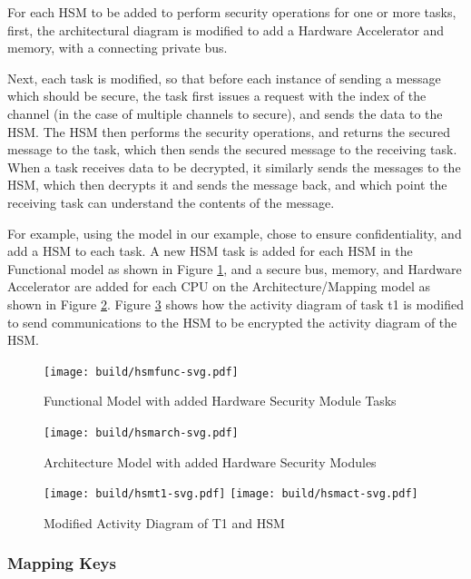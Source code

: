 \documentclass[12pt]{article}
\begin{document}
For each HSM to be added to perform security operations for one or more tasks, first, the architectural diagram is modified to add a Hardware Accelerator and memory, with a connecting private bus.

Next, each task is modified, so that before each instance of sending a message which should be secure, the task first issues a request with the index of the channel (in the case of multiple channels to secure), and sends the data to the HSM. The HSM then performs the security operations, and returns the secured message to the task, which then sends the secured message to the receiving task. When a task receives data to be decrypted, it similarly sends the messages to the HSM, which then decrypts it and sends the message back, and which point the receiving task can understand the contents of the message.

For example, using the model in our example, chose to ensure confidentiality, and add a HSM to each task. A new HSM task is added for each HSM in the Functional model as shown in Figure \ref{fig:hsmfunc}, and a secure bus, memory, and Hardware Accelerator are added for each CPU on the Architecture/Mapping model as shown in Figure \ref{fig:hsmarch}. Figure \ref{fig:hsmt1act} shows how the activity diagram of task t1 is modified to send communications to the HSM to be encrypted the activity diagram of the HSM. 

\begin{figure}[htbp]
\centering
\texttt{[image: build/hsmfunc-svg.pdf]}
\caption{Functional Model with added Hardware Security Module Tasks} \label{fig:hsmfunc}
\end{figure}


\begin{figure}[htbp]
\centering
\texttt{[image: build/hsmarch-svg.pdf]}
\caption{Architecture Model with added Hardware Security Modules} \label{fig:hsmarch}
\end{figure}


\begin{figure}[htbp]
\centering
\texttt{[image: build/hsmt1-svg.pdf]}
\texttt{[image: build/hsmact-svg.pdf]}
\caption{Modified Activity Diagram of T1 and HSM} \label{fig:hsmt1act}
\end{figure}




\subsubsection{Mapping Keys}
\end{document}
